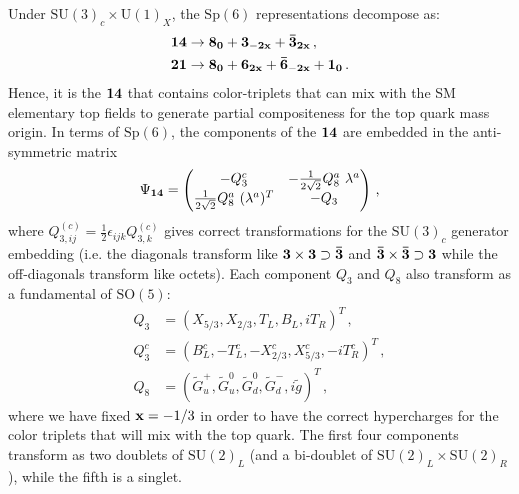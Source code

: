 \documentclass[preprintnumbers,nofootinbib,showpacs,eqsecnum,pre,12pt]{revtex4-1}
\newcommand{\SO}{\text{SO}}
\newcommand{\SU}{\text{SU}}
\newcommand{\U}{\text{U}}
\newcommand{\Sp}{\text{Sp}}
\begin{document}
Under $\SU(3)_c\times \U(1)_X$, the $\Sp(6)$ representations decompose as:
\begin{align}
\bf{14}& \rightarrow \bf{8_0}+\bf{3_{-2x}}+\bf{\bar{3}_{2x}} \,, \\
\bf{21}&\rightarrow \bf{8_0}+\bf{6_{2x}}+\bf{\bar{6}_{-2x}}+\bf{1_0}
\,.
\end{align}
Hence, it is the $\bf 14$ that contains color-triplets that can mix with the SM elementary top fields to generate partial compositeness for the top quark mass origin. In terms of $\Sp(6)$, the components of the $\bf 14$ are embedded in the anti-symmetric matrix
\begin{equation} 
\Psi_{\bf 14} =  \begin{pmatrix}  -Q_3^{c} & - \frac{1}{2\sqrt{2}} Q_8^{a}\ \lambda^a  \\  \frac{1}{2\sqrt{2}} Q^{a}_8\ (\lambda^a)^T  & -Q_3  \end{pmatrix}\,,
\label{eq:tom_a17}
\end{equation}
where $Q^{(c)}_{3,ij}=\frac{1}{2} \epsilon_{ijk}Q^{(c)}_{3,k}$  gives correct transformations for the $\SU(3)_c$ generator embedding (i.e. the diagonals  transform like $\bf{3}\times \bf{3} \supset \bf{\bar{3}}$ and $\bf{\bar{3}}\times \bf{\bar{3}} \supset \bf{3}$ while the off-diagonals transform like octets). Each component $Q_3$ and $Q_8$ also transform as a fundamental of $\SO(5)$:
\begin{subequations}
\begin{align}
Q_3 &=  (X_{5/3}, X_{2/3},T_L,B_L,iT_R)^T\, , \label{eq:q3compo}\\
Q^{c}_{3} &=  ( B_L^c,-T_L^c, -X^c_{2/3}, X^c_{5/3},-i T_R^c)^T\, , \label{eq:q3ccompo}\\
Q_8 &= (\tilde G^+_u, \tilde G^0_u, \tilde G^0_d, \tilde G^-_d, i \tilde g)^T\,, \label{eq:q8compo}
\end{align}
\end{subequations}
where we have fixed ${\bf x}=-1/3$ in order to have the correct hypercharges for the color triplets that will mix with the top quark. The first four components transform as two doublets of $\SU(2)_L$ (and a bi-doublet of $\SU(2)_L \times \SU(2)_R$), while the fifth is a singlet. 
\end{document}
